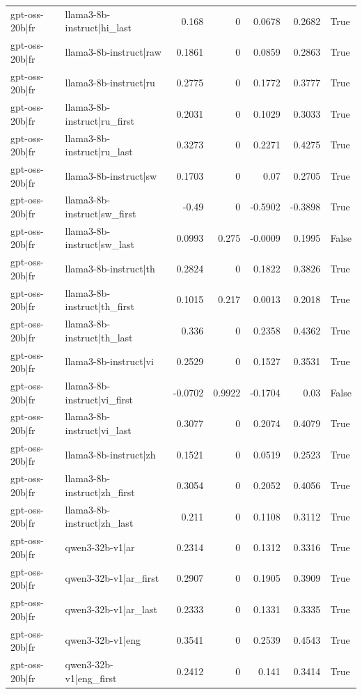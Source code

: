 \begin{table}
\begin{tabular}{l l r r r r l}
gpt-oss-20b|fr & llama3-8b-instruct|hi_last & 0.168 & 0 & 0.0678 & 0.2682 & True \\
gpt-oss-20b|fr & llama3-8b-instruct|raw & 0.1861 & 0 & 0.0859 & 0.2863 & True \\
gpt-oss-20b|fr & llama3-8b-instruct|ru & 0.2775 & 0 & 0.1772 & 0.3777 & True \\
gpt-oss-20b|fr & llama3-8b-instruct|ru_first & 0.2031 & 0 & 0.1029 & 0.3033 & True \\
gpt-oss-20b|fr & llama3-8b-instruct|ru_last & 0.3273 & 0 & 0.2271 & 0.4275 & True \\
gpt-oss-20b|fr & llama3-8b-instruct|sw & 0.1703 & 0 & 0.07 & 0.2705 & True \\
gpt-oss-20b|fr & llama3-8b-instruct|sw_first & -0.49 & 0 & -0.5902 & -0.3898 & True \\
gpt-oss-20b|fr & llama3-8b-instruct|sw_last & 0.0993 & 0.275 & -0.0009 & 0.1995 & False \\
gpt-oss-20b|fr & llama3-8b-instruct|th & 0.2824 & 0 & 0.1822 & 0.3826 & True \\
gpt-oss-20b|fr & llama3-8b-instruct|th_first & 0.1015 & 0.217 & 0.0013 & 0.2018 & True \\
gpt-oss-20b|fr & llama3-8b-instruct|th_last & 0.336 & 0 & 0.2358 & 0.4362 & True \\
gpt-oss-20b|fr & llama3-8b-instruct|vi & 0.2529 & 0 & 0.1527 & 0.3531 & True \\
gpt-oss-20b|fr & llama3-8b-instruct|vi_first & -0.0702 & 0.9922 & -0.1704 & 0.03 & False \\
gpt-oss-20b|fr & llama3-8b-instruct|vi_last & 0.3077 & 0 & 0.2074 & 0.4079 & True \\
gpt-oss-20b|fr & llama3-8b-instruct|zh & 0.1521 & 0 & 0.0519 & 0.2523 & True \\
gpt-oss-20b|fr & llama3-8b-instruct|zh_first & 0.3054 & 0 & 0.2052 & 0.4056 & True \\
gpt-oss-20b|fr & llama3-8b-instruct|zh_last & 0.211 & 0 & 0.1108 & 0.3112 & True \\
gpt-oss-20b|fr & qwen3-32b-v1|ar & 0.2314 & 0 & 0.1312 & 0.3316 & True \\
gpt-oss-20b|fr & qwen3-32b-v1|ar_first & 0.2907 & 0 & 0.1905 & 0.3909 & True \\
gpt-oss-20b|fr & qwen3-32b-v1|ar_last & 0.2333 & 0 & 0.1331 & 0.3335 & True \\
gpt-oss-20b|fr & qwen3-32b-v1|eng & 0.3541 & 0 & 0.2539 & 0.4543 & True \\
gpt-oss-20b|fr & qwen3-32b-v1|eng_first & 0.2412 & 0 & 0.141 & 0.3414 & True \\

\end{tabular}
\end{table}
